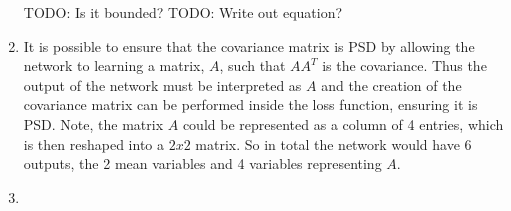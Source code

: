 \documentclass{article}
\begin{document}
\begin{enumerate}[label=(\roman*)]
TODO: Is it bounded?
TODO: Write out equation?



\item It is possible to ensure that the covariance matrix is PSD by allowing the network to learning a matrix, $A$, such that $AA^T$ is the covariance. Thus the output of the network must be interpreted as $A$ and the creation of the covariance matrix can be performed inside the loss function, ensuring it is PSD. Note, the matrix $A$ could be represented as a column of 4 entries, which is then reshaped into a $2x2$ matrix. So in total the network would have 6 outputs, the 2 mean variables and 4 variables representing $A$.

\item 


\end{enumerate}

\end{document}
